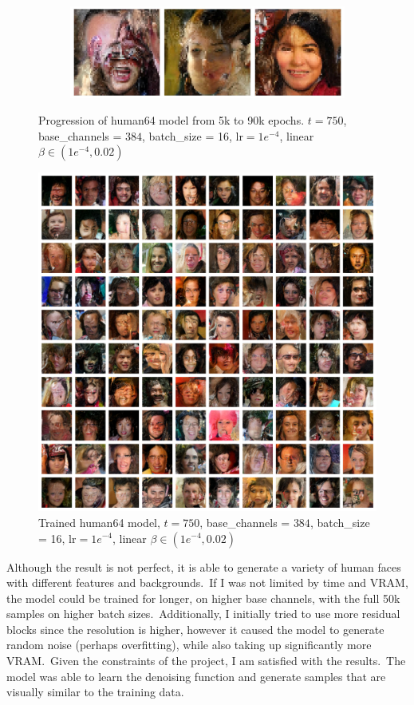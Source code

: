 \documentclass[12pt]{article}
\begin{document}
\begin{figure}[H]
\begin{subfigure}{0.5\textwidth}
  \end{subfigure}%
  \begin{subfigure}{0.5\textwidth}
    \includegraphics[width=1\textwidth]{human90k.jpg}
  \end{subfigure}
  \caption{Progression of human64 model from 5k to 90k epochs. $t=750$, base\_channels = $384$, batch\_size = 16, lr$=1e^{-4}$, linear $\beta \in(1e^{-4}, 0.02)$}
\end{figure}

\begin{figure}[H]
  \centering
  \includegraphics[width=1\textwidth]{human64.png}
  \caption{Trained human64 model, $t=750$, base\_channels = $384$, batch\_size = 16, lr$=1e^{-4}$, linear $\beta \in(1e^{-4}, 0.02)$}
\end{figure}

Although the result is not perfect, it is able to generate a variety of human faces with different features and backgrounds.\
If I was not limited by time and VRAM, the model could be trained for longer, on higher base channels, with the full 50k samples on higher batch sizes.\
Additionally, I initially tried to use more residual blocks since the resolution is higher, however it caused the model to generate random noise (perhaps overfitting), while also taking up significantly more VRAM.\
Given the constraints of the project, I am satisfied with the results.\
The model was able to learn the denoising function and generate samples that are visually similar to the training data.\\
\end{document}
